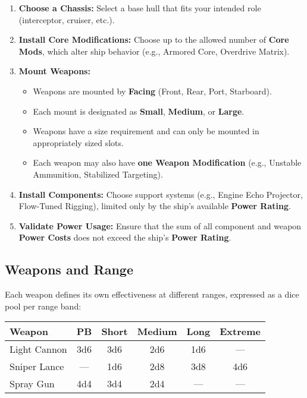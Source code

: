 \documentclass[11pt]{article}
\begin{document}
\begin{enumerate}
    \item \textbf{Choose a Chassis:} Select a base hull that fits your intended role (interceptor, cruiser, etc.).

    \item \textbf{Install Core Modifications:} Choose up to the allowed number of \textbf{Core Mods}, which alter ship behavior (e.g., Armored Core, Overdrive Matrix).
    
    \item \textbf{Mount Weapons:}
    \begin{itemize}
        \item Weapons are mounted by \textbf{Facing} (Front, Rear, Port, Starboard).
        \item Each mount is designated as \textbf{Small}, \textbf{Medium}, or \textbf{Large}.
        \item Weapons have a size requirement and can only be mounted in appropriately sized slots.
        \item Each weapon may also have \textbf{one Weapon Modification} (e.g., Unstable Ammunition, Stabilized Targeting).
    \end{itemize}
    
    \item \textbf{Install Components:} Choose support systems (e.g., Engine Echo Projector, Flow-Tuned Rigging), limited only by the ship’s available \textbf{Power Rating}.
    
    \item \textbf{Validate Power Usage:} Ensure that the sum of all component and weapon \textbf{Power Costs} does not exceed the ship’s \textbf{Power Rating}.
\end{enumerate}

\subsection{Weapons and Range}

Each weapon defines its own effectiveness at different ranges, expressed as a dice pool per range band:

\begin{center}
\begin{tabular}{lccccc}
\toprule
\textbf{Weapon} & \textbf{PB} & \textbf{Short} & \textbf{Medium} & \textbf{Long} & \textbf{Extreme} \\
\midrule
Light Cannon & 3d6 & 3d6 & 2d6 & 1d6 & — \\
Sniper Lance & — & 1d6 & 2d8 & 3d8 & 4d6 \\
Spray Gun & 4d4 & 3d4 & 2d4 & — & — \\
\bottomrule
\end{tabular}
\end{center}
\end{document}
